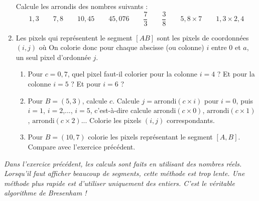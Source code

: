 \documentclass[class=report,crop=false, 12pt]{standalone}
\begin{document}
\begin{activite}
\begin{enumerate}

    
    Calcule les arrondis des nombres suivants :
    $$1,3 \qquad 7,8 \qquad 10,45 \qquad 45,076 \qquad \frac{7}{3} \qquad \frac{3}{8} \qquad 5,8 \times 7
\qquad 1,3 \times 2,4$$


   \item Les pixels qui représentent le segment $[AB]$ sont les pixels de coordonnées $(i,j)$ où
   On colorie donc pour chaque abscisse (ou colonne) $i$ entre $0$ et $a$, un seul pixel d'ordonnée $j$.
   
   \begin{enumerate}
     \item Pour $c = 0,7$, quel pixel faut-il colorier pour la colonne $i=4$ ? Et pour la colonne $i=5$ ? Et pour $i=6$ ?
     \item Pour $B=(5,3)$, calcule $c$. Calcule $j=\text{arrondi}(c\times i)$ pour $i=0$, puis $i=1$, $i=2$,..., $i=5$, c'est-à-dire calcule $\text{arrondi}(c\times 0)$, $\text{arrondi}(c\times 1)$, $\text{arrondi}(c\times 2)$... Colorie les pixels $(i,j)$ correspondants.
     
     \item Pour $B=(10,7)$ colorie les pixels représentant le segment $[A,B]$. Compare avec l'exercice précédent.
   \end{enumerate}   
\end{enumerate}

\end{activite}

\bigskip

\emph{Dans l'exercice précédent, les calculs sont faits en utilisant des nombres réels. Lorsqu'il faut afficher beaucoup de segments, cette méthode est trop lente. Une méthode plus rapide est d'utiliser uniquement des entiers. C'est le véritable algorithme de Bresenham !}

\bigskip
\end{document}
